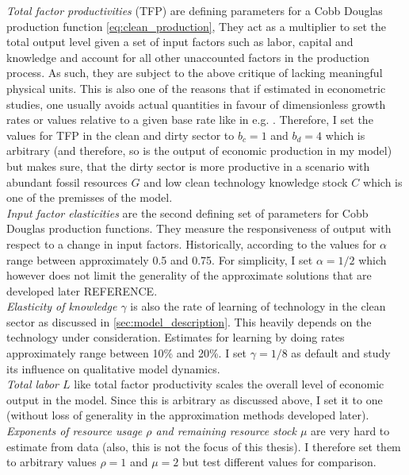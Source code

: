 \textit{Total factor productivities} (TFP) are defining parameters for a Cobb Douglas production function \eqref{eq:clean_production}, They act as a multiplier to set the total output level given a set of input factors such as labor, capital and knowledge and account for all other unaccounted factors in the production process. As such, they are subject to the above critique of lacking meaningful physical units. This is also one of the reasons that if estimated in econometric studies, one usually avoids actual quantities in favour of dimensionless growth rates or values relative to a given base rate like in e.g. \cite{Gal2013, Hooper1997, Bernstein2018}. Therefore, I set the values for TFP in the clean and dirty sector to $b_c=1$ and $b_d=4$ which is arbitrary (and therefore, so is the output of economic production in my model) but makes sure, that the dirty sector is more productive in a scenario with abundant fossil resources $G$ and low clean technology knowledge stock $C$ which is one of the premisses of the model. \\

\textit{Input factor elasticities} are the second defining set of parameters for Cobb Douglas production functions. They measure the responsiveness of output with respect to a change in input factors. Historically, according to \cite{Douglas1976} the values for $\alpha$ range between approximately 0.5 and 0.75. For simplicity, I set $\alpha=1/2$ which however does not limit the generality of the approximate solutions that are developed later REFERENCE.\\

\textit{Elasticity of knowledge $\gamma$} is also the rate of learning of technology in the clean sector as discussed in \ref{sec:model_description}. This heavily depends on the technology under consideration. Estimates for learning by doing rates approximately range between 10\% and 20\%. I set $\gamma=1/8$ as default and study its influence on qualitative model dynamics.\\

\textit{Total labor $L$} like total factor productivity scales the overall level of economic output in the model. Since this is arbitrary as discussed above, I set it to one (without loss of generality in the approximation methods developed later).\\

\textit{Exponents of resource usage $\rho$ and remaining resource stock $\mu$} are very hard to estimate from data (also, this is not the focus of this thesis). I therefore set them to arbitrary values $\rho=1$ and $\mu=2$ but test different values for comparison.\\

